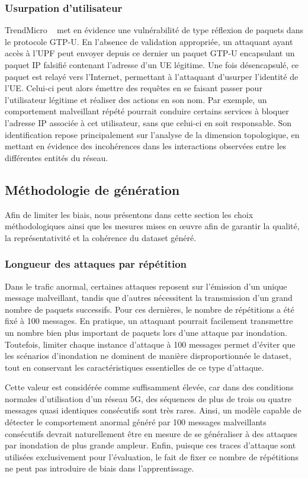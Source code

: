 \documentclass[a4paper,11pt,twoside]{StyleThese}
\begin{document}
\subsubsection{Usurpation d'utilisateur}
TrendMicro ~\cite{spoof_gtp} met en évidence une vulnérabilité de type réflexion de paquets dans le protocole GTP-U. En l’absence de validation appropriée, un attaquant ayant accès à l’UPF peut envoyer depuis ce dernier un paquet GTP-U encapsulant un paquet IP falsifié contenant l'adresse d'un UE légitime. Une fois désencapsulé, ce paquet est relayé vers l’Internet, permettant à l’attaquant d’usurper l’identité de l’UE. Celui-ci peut alors émettre des requêtes en se faisant passer pour l’utilisateur légitime et réaliser des actions en son nom. Par exemple, un comportement malveillant répété pourrait conduire certains services à bloquer l’adresse IP associée à cet utilisateur, sans que celui-ci en soit responsable. Son identification repose principalement sur l’analyse de la dimension topologique, en mettant en évidence des incohérences dans les interactions observées entre les différentes entités du réseau.

\subsection{Méthodologie de génération}
Afin de limiter les biais, nous présentons dans cette section les choix méthodologiques ainsi que les mesures mises en œuvre afin de garantir la qualité, la représentativité et la cohérence du dataset généré.

\subsubsection{Longueur des attaques par répétition}
Dans le trafic anormal, certaines attaques reposent sur l’émission d’un unique message malveillant, tandis que d’autres nécessitent la transmission d’un grand nombre de paquets successifs. Pour ces dernières, le nombre de répétitions a été fixé à 100 messages. En pratique, un attaquant pourrait facilement transmettre un nombre bien plus important de paquets lors d’une attaque par inondation. Toutefois, limiter chaque instance d’attaque à 100 messages permet d’éviter que les scénarios d’inondation ne dominent de manière disproportionnée le dataset, tout en conservant les caractéristiques essentielles de ce type d’attaque.

Cette valeur est considérée comme suffisamment élevée, car dans des conditions normales d’utilisation d’un réseau 5G, des séquences de plus de trois ou quatre messages quasi identiques consécutifs sont très rares. Ainsi, un modèle capable de détecter le comportement anormal généré par 100 messages malveillants consécutifs devrait naturellement être en mesure de se généraliser à des attaques par inondation de plus grande ampleur. Enfin, puisque ces traces d’attaque sont utilisées exclusivement pour l’évaluation, le fait de fixer ce nombre de répétitions ne peut pas introduire de biais dans l’apprentissage.
\end{document}
